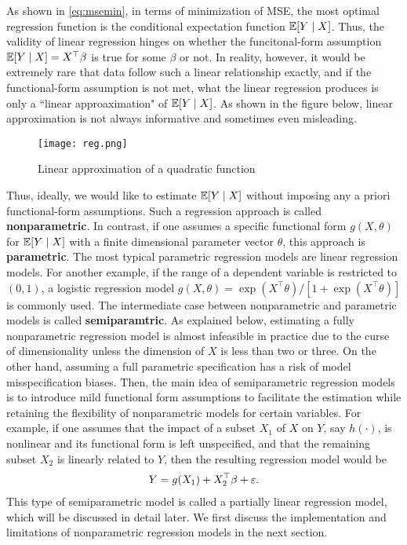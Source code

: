 \documentclass[11pt, A4paper, openany, uplatex]{book}
\begin{document}
As shown in \eqref{eq:msemin},  in terms of minimization of MSE, the most optimal regression function is the conditional expectation function $\mathbb{E} [Y \mid X]$.
Thus, the validity of linear regression hinges on whether the funcitonal-form assumption $\mathbb{E}[Y \mid X] = X^\top\beta$ is true for some $\beta$ or not.
In reality, however, it would be extremely rare that data follow such a linear relationship exactly, and if the functional-form assumption is not met, what the linear regression produces is only a ``linear approaximation" of $\mathbb{E}[Y \mid X]$.
As shown in the figure below, linear approximation is not always informative and sometimes even misleading.
\begin{figure}[h!]
	\begin{center}
		\texttt{[image: reg.png]}
		\caption{Linear approximation of a quadratic function}
	\end{center}
\end{figure}

Thus, ideally, we would like to estimate $\mathbb{E} [Y \mid X]$ without imposing any a priori functional-form assumptions.
Such a regression approach is called \textbf{nonparametric}.
In contrast, if one assumes a specific functional form $g(X, \theta)$ for $\mathbb{E}[Y \mid X]$ with a finite dimensional parameter vector $\theta$, this approach is \textbf{parametric}.
The most typical parametric regression models are linear regression models.
For another example, if the range of a dependent variable is restricted to $(0,1)$, a logistic regression model $g(X, \theta) = \exp(X^\top \theta)/[1 + \exp(X^\top \theta)]$ is commonly used. 
The intermediate case between nonparametric and parametric models is called \textbf{semiparamtric}.
As explained below, estimating a fully nonparametric regression model is almost infeasible in practice due to the curse of dimensionality unless the dimension of $X$ is less than two or three.
On the other hand, assuming a full parametric specification has a risk of model misspecification biases.
Then, the main idea of semiparametric regression models is to introduce mild functional form assumptions to facilitate the estimation while retaining the flexibility of nonparametric models for certain variables.
For example, if one assumes that the impact of a subset $X_1$ of $X$ on $Y$, say $h(\cdot)$, is nonlinear and its functional form is left unspecified, and that the remaining subset $X_2$ is linearly related to $Y$, then the resulting regression model would be 
\begin{align*}
	Y = g(X_1) + X_2^\top\beta + \varepsilon.
\end{align*}
This type of semiparametric model is called a partially linear regression model, which will be discussed in detail later.
We first discuss the implementation and limitations of nonparametric regression models in the next section.
\end{document}
